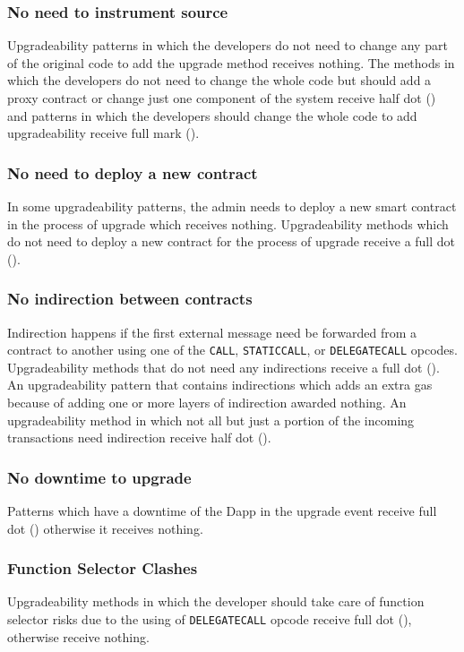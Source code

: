 \subsubsection{No need to instrument source}
Upgradeability patterns in which the developers do not need to change any part of the original code to add the upgrade method receives nothing. The methods in which the developers do not need to change the whole code but should add a proxy contract or change just one component of the system receive half dot (\prt) and patterns in which the developers should change the whole code to add upgradeability receive full mark (\full).


\subsubsection{No need to deploy a new contract}
In some upgradeability patterns, the admin needs to deploy a new smart contract in the process of upgrade which receives nothing. Upgradeability methods which do not need to deploy a new contract for the process of upgrade receive a full dot (\full).

\subsubsection{No indirection between contracts}  
Indirection happens if the first external message need be forwarded from a contract to another using one of the \texttt{CALL}, \texttt{STATICCALL}, or \texttt{DELEGATECALL} opcodes. Upgradeability methods that do not need any indirections receive a full dot (\full). An upgradeability pattern that contains indirections which adds an extra gas because of adding one or more layers of indirection awarded nothing. An upgradeability method in which not all but just a portion of the incoming transactions need indirection receive half dot (\prt). 


\subsubsection{No downtime to upgrade}
Patterns which have a downtime of the Dapp in the upgrade event receive full dot (\full) otherwise it receives nothing. 

\subsubsection{Function Selector Clashes}
Upgradeability methods in which the developer should take care of function selector risks due to the using of \texttt{DELEGATECALL} opcode receive full dot (\full), otherwise receive nothing. 

